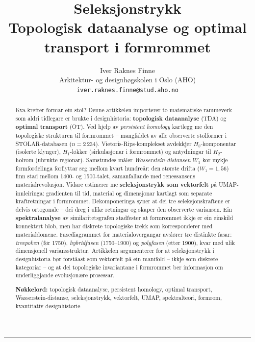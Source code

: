 \documentclass[10pt, a4paper, twocolumn]{article}
\title{%
  \textbf{Seleksjonstrykk}\\[0.4em]
  \large Topologisk dataanalyse og optimal transport i formrommet%
}
\author{%
  Iver Raknes Finne\\
  \small Arkitektur- og designh\o gskolen i Oslo (AHO)\\
  \small \texttt{iver.raknes.finne@stud.aho.no}
}
\date{}
\begin{document}
\maketitle

\begin{abstract}
\noindent Kva krefter formar ein stol? Denne artikkelen importerer to matematiske rammeverk som aldri tidlegare er brukte i designhistoria: \textbf{topologisk dataanalyse} (TDA) og \textbf{optimal transport} (OT). Ved hjelp av \emph{persistent homology} kartlegg me den topologiske strukturen til formrommet -- mangfaldet av alle observerte stolformer i STOLAR-databasen ($n = 2\,234$). Vietoris-Rips-komplekset avdekkjer $H_0$-komponentar (isolerte klynger), $H_1$-l\o kker (sirkulasjonar i formrommet) og antydningar til $H_2$-holrom (ubrukte regionar). Samstundes m\aa ler \emph{Wasserstein-distansen} $W_1$ kor mykje formfordelinga forflyttar seg mellom kvart hundre\aa r: den st\o rste drifta ($W_1 = 1{,}56$) finn stad mellom 1400- og 1500-talet, samanfallande med renessansens materialrevolusjon. Vidare estimerer me \textbf{seleksjonstrykk som vektorfelt} p\aa{} UMAP-innleiringa: gradienten til tid, material og dimensjonar kartlagt som separate kraftretningar i formrommet. Dekomponeringa syner at dei tre seleksjonskraftene er delvis ortogonale -- dei dreg i ulike retningar og skaper den observerte variansen. Ein \textbf{spektralanalyse} av similaritetsgrafen stadfester at formrommet ikkje er ein einskild konnektert blob, men har diskrete topologiske trekk som korresponderer med materialdomene. Fasediagrammet for materialovergangar avsl\o rer tre distinkte fasar: \emph{treepoken} (f\o r 1750), \emph{hybridfasen} (1750--1900) og \emph{polyfasen} (etter 1900), kvar med ulik dimensjonell variansstruktur. Artikkelen argumenterer for at seleksjonstrykk i designhistoria b\o r forst\aa ast som vektorfelt p\aa{} ein manifold -- ikkje som diskrete kategoriar -- og at dei topologiske invariantane i formrommet ber informasjon om underliggjande evolusjon\ae re prosessar.

\medskip
\noindent\textbf{N\o kkelord:} topologisk dataanalyse, persistent homology, optimal transport, Wasserstein-distanse, seleksjonstrykk, vektorfelt, UMAP, spektralteori, formrom, kvantitativ designhistorie
\end{abstract}

\vspace{1em}
\hrule
\vspace{1.5em}
\end{document}

